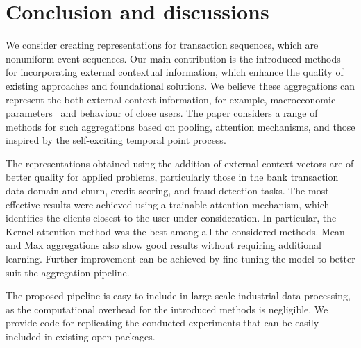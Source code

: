 \section{Conclusion and discussions}

We consider creating representations for transaction sequences, which are nonuniform event sequences. 
Our main contribution is the introduced methods for incorporating external contextual information, which enhance the quality of existing approaches and foundational solutions. 
We believe these aggregations can represent the both external context information, for example, macroeconomic parameters~\cite{begicheva2021bank} and behaviour of close users. 
The paper considers a range of methods for such aggregations based on pooling, attention mechanisms, and those inspired by the self-exciting temporal point process. 

The representations obtained using the addition of external context vectors are of better quality for applied problems, particularly those in the bank transaction data domain and churn, credit scoring, and fraud detection tasks. 
The most effective results were achieved using a trainable attention mechanism, which identifies the clients closest to the user under consideration.
In particular, the Kernel attention method was the best among all the considered methods. 
Mean and Max aggregations also show good results without requiring additional learning. 
Further improvement can be achieved by fine-tuning the model to better suit the aggregation pipeline.

The proposed pipeline is easy to include in large-scale industrial data processing, as the computational overhead for the introduced methods is negligible. 
We provide code for replicating the conducted experiments that can be easily included in existing open packages.

